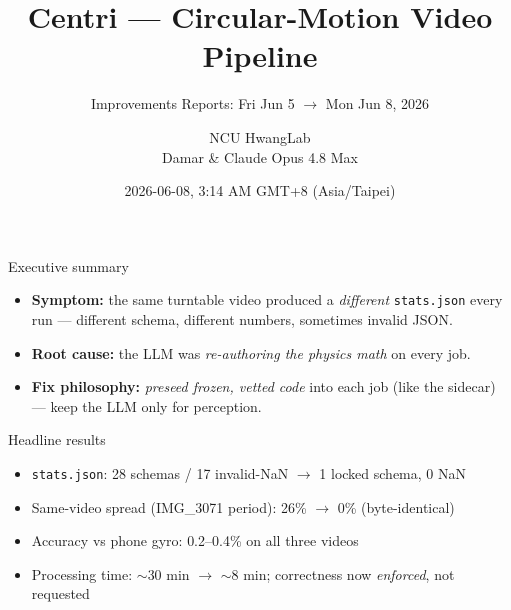 \documentclass[10pt,aspectratio=169]{beamer}
\title{Centri --- Circular-Motion Video Pipeline}
\subtitle{Improvements Reports: Fri Jun 5 $\to$ Mon Jun 8, 2026}
\author{NCU HwangLab \\ Damar \& Claude Opus 4.8 Max}
\date{2026-06-08, 3:14 AM GMT+8 (Asia/Taipei)}
\newcommand{\gd}[1]{\textcolor{good}{#1}}
\newcommand{\bd}[1]{\textcolor{bad}{#1}}
\begin{document}
\maketitle

\begin{frame}{Executive summary}
\begin{itemize}
  \item \textbf{Symptom:} the same turntable video produced a \emph{different} \texttt{stats.json} every run --- different schema, different numbers, sometimes invalid JSON.
  \item \textbf{Root cause:} the LLM was \emph{re-authoring the physics math} on every job.
  \item \textbf{Fix philosophy:} \emph{preseed frozen, vetted code} into each job (like the sidecar) --- keep the LLM only for perception.
\end{itemize}
\vspace{0.3em}
\begin{block}{Headline results}
\begin{itemize}
  \item \texttt{stats.json}: \bd{28 schemas / 17 invalid-NaN} $\to$ \gd{1 locked schema, 0 NaN}
  \item Same-video spread (IMG\_3071 period): \bd{26\%} $\to$ \gd{0\% (byte-identical)}
  \item Accuracy vs phone gyro: \gd{0.2--0.4\%} on all three videos
  \item Processing time: \bd{$\sim$30 min} $\to$ \gd{$\sim$8 min}; correctness now \emph{enforced}, not requested
\end{itemize}
\end{block}
\end{frame}
\end{document}
